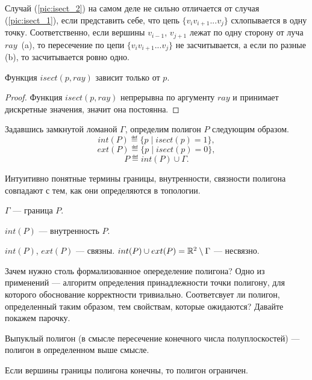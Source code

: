 Случай (\ref{pic:isect_2}) на самом деле не сильно отличается от случая (\ref{pic:isect_1}), если представить себе, что 
цепь $\{v_iv_{i+1}...v_j\}$ схлопывается в одну точку. Соответственно, если вершины $v_{i-1}$, $v_{j+1}$ лежат по одну сторону 
от луча $ray$~(a), то пересечение по цепи $\{v_iv_{i+1}...v_j\}$ не засчитывается, а если по разные (b), 
то засчитывается ровно одно.

\begin{statement}
Функция $isect(p, ray)$ зависит только от $p$. 
\begin{proof}
Функция $isect(p, ray)$ непрерывна по аргументу $ray$ и принимает дискретные значения, значит она постоянна.
\end{proof}
\end{statement}

\begin{definition} Задавшись замкнутой ломаной $\Gamma$, определим полигон $P$ следующим образом. \\
$$int(P) \eqdef \{ p \; | \; isect(p) = 1 \},$$
$$ext(P) \eqdef \{ p \; | \; isect(p) = 0 \},$$
$$P \eqdef int(P) \cup \Gamma.$$
\end{definition}

Интуитивно понятные термины границы, внутренности, связности полигона совпадают с тем, как они определяются в топологии.

\begin{statement}
$\Gamma$ --- граница $P$.
\end{statement}
\begin{statement}
$int(P)$ --- внутренность $P$.
\end{statement}
\begin{statement}
$int(P)$, $ext(P)$ --- связны. $int(P) \cup ext(P) = \mathbb{R}^2 \setminus \Gamma$ --- несвязно.
\end{statement}

Зачем нужно столь формализованное опеределение полигона? Одно из применений --- алгоритм определения принадлежности точки 
полигону, для которого обоснование корректности тривиально. Соответсвует ли полигон, определенный таким образом, 
тем свойствам, которые ожидаются? Давайте покажем парочку.

\begin{statement}
Выпуклый полигон (в смысле пересечение конечного числа полуплоскостей) --- полигон в определенном выше смысле.
\end{statement}
\begin{statement}
Если вершины границы полигона конечны, то полигон ограничен.    
\end{statement}
